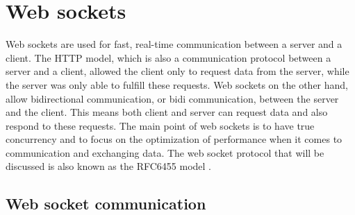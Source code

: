 \documentclass[a4paper, 11pt]{report}
\begin{document}
\section{Web sockets}
Web sockets are used for fast, real-time communication between a server and a client. The HTTP model, which is also a communication protocol between a server and a client, allowed the client only to request data from the server, while the server was only able to fulfill these requests. Web sockets on the other hand, allow bidirectional communication, or bidi communication, between the server and the client. This means both client and server can request data and also respond to these requests. The main point of web sockets is to have true concurrency and to focus on the optimization of performance when it comes to communication and exchanging data. The web socket protocol that will be discussed is also known as the RFC6455 model \cite{RFC6455}.

	\subsection{Web socket communication}\label{WebSocketCom}
\end{document}
